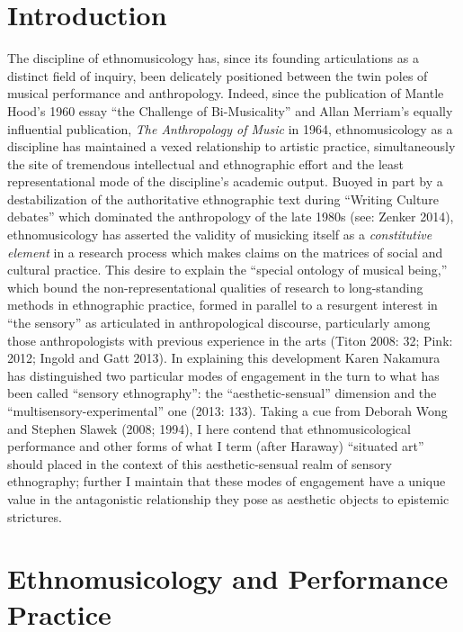 \hypertarget{introduction}{%
\section{Introduction}\label{introduction}}

The discipline of ethnomusicology has, since its founding articulations
as a distinct field of inquiry, been delicately positioned between the
twin poles of musical performance and anthropology. Indeed, since the
publication of Mantle Hood's 1960 essay ``the Challenge of
Bi-Musicality'' and Allan Merriam's equally influential publication,
\emph{The Anthropology of Music} in 1964, ethnomusicology as a
discipline has maintained a vexed relationship to artistic practice,
simultaneously the site of tremendous intellectual and ethnographic
effort and the least representational mode of the discipline's academic
output. Buoyed in part by a destabilization of the authoritative
ethnographic text during ``Writing Culture debates'' which dominated the
anthropology of the late 1980s (see: Zenker 2014), ethnomusicology has
asserted the validity of musicking itself as a \emph{constitutive
element} in a research process which makes claims on the matrices of
social and cultural practice. This desire to explain the ``special
ontology of musical being,'' which bound the non-representational
qualities of research to long-standing methods in ethnographic practice,
formed in parallel to a resurgent interest in ``the sensory'' as
articulated in anthropological discourse, particularly among those
anthropologists with previous experience in the arts (Titon 2008: 32;
Pink: 2012; Ingold and Gatt 2013). In explaining this development Karen
Nakamura has distinguished two particular modes of engagement in the
turn to what has been called ``sensory ethnography'': the
``aesthetic-sensual'' dimension and the ``multisensory-experimental''
one (2013: 133). Taking a cue from Deborah Wong and Stephen Slawek
(2008; 1994), I here contend that ethnomusicological performance and
other forms of what I term (after Haraway) ``situated art'' should
placed in the context of this aesthetic-sensual realm of sensory
ethnography; further I maintain that these modes of engagement have a
unique value in the antagonistic relationship they pose as aesthetic
objects to epistemic strictures.

\hypertarget{ethnomusicology-and-performance-practice}{%
\section{Ethnomusicology and Performance
Practice}\label{ethnomusicology-and-performance-practice}}

